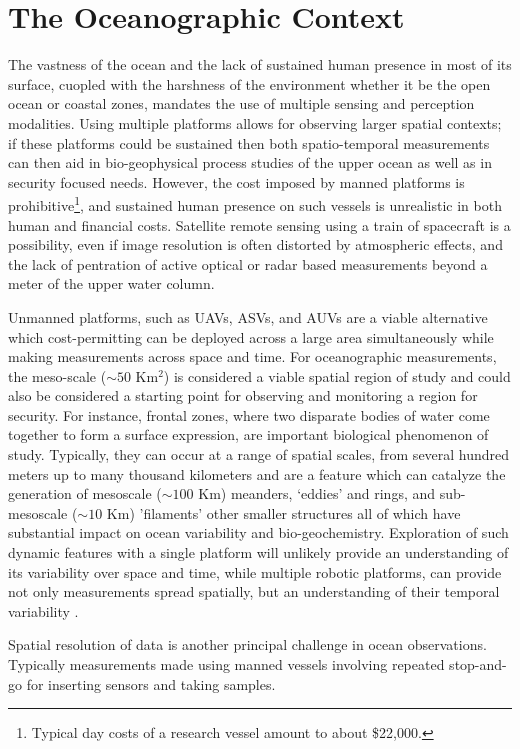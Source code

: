 \section{The Oceanographic Context}
\label{sec:context}

The vastness of the ocean and the lack of sustained human presence in
most of its surface, cuopled with the harshness of the environment
whether it be the open ocean or coastal zones, mandates the use of
multiple sensing and perception modalities. Using multiple platforms
allows for observing larger spatial contexts; if these platforms could
be sustained then both spatio-temporal measurements can then aid in
bio-geophysical process studies of the upper ocean as well as in
security focused needs. However, the cost imposed by manned platforms
is prohibitive\footnote{Typical day costs of a research vessel amount
  to about \$22,000.}, and sustained human presence on such vessels is
unrealistic in both human and financial costs. Satellite remote
sensing using a train of spacecraft is a possibility, even if image
resolution is often distorted by atmospheric effects, and the lack of
pentration of active optical or radar based measurements beyond a
meter of the upper water column. 

Unmanned platforms, such as UAVs, ASVs, and AUVs are a viable
alternative which cost-permitting can be deployed across a large area
simultaneously while making measurements across space and time. For
oceanographic measurements, the meso-scale ($\sim 50$ Km$^2$) is
considered a viable spatial region of study and could also be
considered a starting point for observing and monitoring a region for
security. For instance, frontal zones, where two disparate bodies of
water come together to form a surface expression, are important
biological phenomenon of study. Typically, they can occur at a range
of spatial scales, from several hundred meters up to many thousand
kilometers \cite{belkin2007fronts} and are a feature which can
catalyze the generation of mesoscale ($\sim 100$ Km) meanders,
‘eddies’ and rings, and sub-mesoscale ($\sim 10$ Km) 'filaments' other
smaller structures all of which have substantial impact on ocean
variability and bio-geochemistry. Exploration of such dynamic features
with a single platform will unlikely provide an understanding of its
variability over space and time, while multiple robotic platforms, can
provide not only measurements spread spatially, but an understanding
of their temporal variability \cite{pinto20,pinto22}.

Spatial resolution of data is another principal challenge in ocean
observations. Typically measurements made using manned vessels involving
repeated stop-and-go for inserting sensors and taking samples. 

